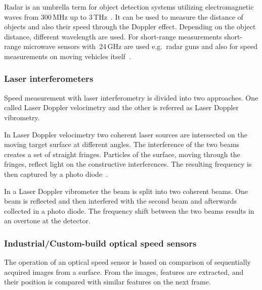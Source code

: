 \documentclass[12pt,a4paper]{article}
\begin{document}
Radar is an umbrella term for object detection systems utilizing electromagnetic waves from 300\,MHz up to 3\,THz~\cite{nrt}.
It can be used to measure the distance of objects and also their speed through the Doppler effect.
Depending on the object distance, different wavelength are used.
For short-range measurements short-range microwave sensors with~24\,GHz are used e.g.\ radar guns and also for speed measurements on moving vehicles itself~\cite{s_r_radar}.

\subsubsection{Laser interferometers}

Speed measurement with laser interferometry is divided into two approaches.
One called Laser Doppler velocimetry and the other is referred as Laser Doppler vibrometry.

In Laser Doppler velocimetry two coherent laser sources are intersected on the moving target surface at different angles.
The interference of the two beams creates a set of straight fringes. 
Particles of the surface, moving through the fringes, reflect light on the constructive interferences.
The resulting frequency is then captured by a photo diode~\cite{laser_vel}.


In a Laser Doppler vibrometer the beam is split into two coherent beams.
One beam is reflected and then interfered with the second beam and afterwards collected in a photo diode. 
The frequency shift between the two beams results in an overtone at the detector.





\subsubsection{Industrial/Custom-build optical speed sensors}

The operation of an optical speed sensor is based on comparison of sequentially acquired images from a surface.
From the images, features are extracted, and their position is compared with similar features on the next frame. 
\end{document}
